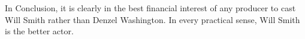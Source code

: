 \documentclass[]{article}
\begin{document}
\noindent In Conclusion, it is clearly in the best financial interest of
any producer to cast Will Smith rather than Denzel Washington. In every
practical sense, Will Smith is the better actor.






\newpage
\theendnotes

\newpage
\begin{auxmulticols}{1}
\singlespacing 


\end{auxmulticols}

\newpage
{
\hypersetup{linkcolor=black}
\setcounter{tocdepth}{3}
\tableofcontents
}
\end{document}
